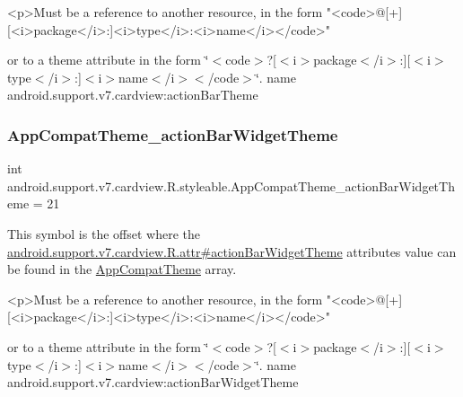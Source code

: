 \begin{DoxyVerb}      <p>Must be a reference to another resource, in the form "<code>@[+][<i>package</i>:]<i>type</i>:<i>name</i></code>"
\end{DoxyVerb}
 or to a theme attribute in the form \char`\"{}$<$code$>$?\mbox{[}$<$i$>$package$<$/i$>$\+:\mbox{]}\mbox{[}$<$i$>$type$<$/i$>$\+:\mbox{]}$<$i$>$name$<$/i$>$$<$/code$>$\char`\"{}.  name android.\+support.\+v7.\+cardview\+:action\+Bar\+Theme \mbox{\label{classandroid_1_1support_1_1v7_1_1cardview_1_1R_1_1styleable_a3c5e0815c1f2e11931d5751bdea83e88}} 
\subsubsection{\texorpdfstring{App\+Compat\+Theme\+\_\+action\+Bar\+Widget\+Theme}{AppCompatTheme\_actionBarWidgetTheme}}
{\footnotesize\ttfamily int android.\+support.\+v7.\+cardview.\+R.\+styleable.\+App\+Compat\+Theme\+\_\+action\+Bar\+Widget\+Theme = 21\hspace{0.3cm}{\ttfamily [static]}}

This symbol is the offset where the \hyperlink{classandroid_1_1support_1_1v7_1_1cardview_1_1R_1_1attr_a1785c41d63b19609ccdcf0b1806a98a8}{android.\+support.\+v7.\+cardview.\+R.\+attr\#action\+Bar\+Widget\+Theme} attribute\textquotesingle{}s value can be found in the \hyperlink{classandroid_1_1support_1_1v7_1_1cardview_1_1R_1_1styleable_a52e6f69f954ecc2622d72c0b4d298938}{App\+Compat\+Theme} array.

\begin{DoxyVerb}      <p>Must be a reference to another resource, in the form "<code>@[+][<i>package</i>:]<i>type</i>:<i>name</i></code>"
\end{DoxyVerb}
 or to a theme attribute in the form \char`\"{}$<$code$>$?\mbox{[}$<$i$>$package$<$/i$>$\+:\mbox{]}\mbox{[}$<$i$>$type$<$/i$>$\+:\mbox{]}$<$i$>$name$<$/i$>$$<$/code$>$\char`\"{}.  name android.\+support.\+v7.\+cardview\+:action\+Bar\+Widget\+Theme \mbox{\label{classandroid_1_1support_1_1v7_1_1cardview_1_1R_1_1styleable_aaa6dcc1366883a5cd43e6dee5173fcaf}} 
